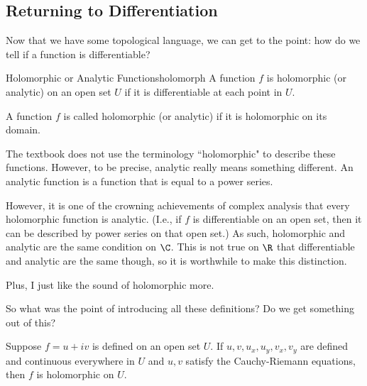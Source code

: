 \subsection{Returning to Differentiation}

Now that we have some topological language, we can get to the point: how do we tell if a function is differentiable?

\begin{defbo}{Holomorphic or Analytic Functions}{holomorph}
A function $f$ is holomorphic (or analytic) on an open set $U$ if it is differentiable at each point in $U$.

A function $f$ is called holomorphic (or analytic) if it is holomorphic on its domain.
\end{defbo}

\begin{note} The textbook does not use the terminology ``holomorphic" to describe these functions. However, to be precise, analytic really means something different. An analytic function is a function that is equal to a power series.

However, it is one of the crowning achievements of complex analysis that every holomorphic function is analytic. (I.e., if $f$ is differentiable on an open set, then it can be described by power series on that open set.) As such, holomorphic and analytic are the same condition on $\C$. This is not true on $\R$ that differentiable and analytic are the same though, so it is worthwhile to make this distinction.

Plus, I just like the sound of holomorphic more.
\end{note}

So what was the point of introducing all these definitions? Do we get something out of this?

\begin{thmbo}{}{}Suppose $f = u + iv$ is defined on an open set $U$. If $u,v, u_x, u_y, v_x, v_y$ are defined and continuous everywhere in $U$ and $u,v$ satisfy the Cauchy-Riemann equations, then $f$ is holomorphic on $U$.
\end{thmbo}

